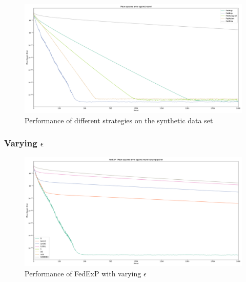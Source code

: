 \documentclass{article}
\begin{document}
\begin{figure}
    \centerline{\includegraphics[width=.85\linewidth]{figs/synthetic_2000Rounds.pdf}}
    \caption{Performance of different strategies on the synthetic data set}
    \label{fig:2000RoundsSynthetic}
\end{figure}

\subsubsection{Varying $\epsilon$}

\begin{figure}
    \centerline{\includegraphics[width=.85\linewidth]{figs/synthetic_varyingEpsilon.pdf}}
    \caption{Performance of FedExP with varying $\epsilon$}
    \label{fig:varyingEpsilon}
\end{figure}
\end{document}
